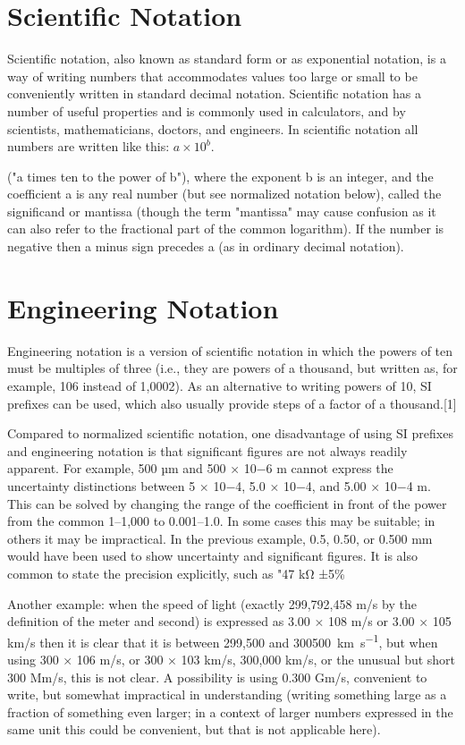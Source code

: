 \documentclass{tufte-book}
\begin{document}
\section{Scientific Notation}


Scientific notation, also known as standard form or as exponential notation, is a way of writing numbers that accommodates values too large or small to be conveniently written in standard decimal notation. Scientific notation has a number of useful properties and is commonly used in calculators, and by scientists, mathematicians, doctors, and engineers.
In scientific notation all numbers are written like this:
\(a \times 10^{b}\).

("a times ten to the power of b"), where the exponent b is an integer, and the coefficient a is any real number (but see normalized notation below), called the significand or mantissa (though the term "mantissa" may cause confusion as it can also refer to the fractional part of the common logarithm). If the number is negative then a minus sign precedes a (as in ordinary decimal notation).


\section{Engineering Notation}

Engineering notation is a version of scientific notation in which the powers of ten must be multiples of three (i.e., they are powers of a thousand, but written as, for example, 106 instead of 1,0002). As an alternative to writing powers of 10, SI prefixes can be used, which also usually provide steps of a factor of a thousand.[1]

Compared to normalized scientific notation, one disadvantage of using SI prefixes and engineering notation is that significant figures are not always readily apparent. For example, 500 µm and 500 × 10−6 m cannot express the uncertainty distinctions between 5 × 10−4, 5.0 × 10−4, and 5.00 × 10−4 m. This can be solved by changing the range of the coefficient in front of the power from the common 1–1,000 to 0.001–1.0. In some cases this may be suitable; in others it may be impractical. In the previous example, 0.5, 0.50, or 0.500 mm would have been used to show uncertainty and significant figures. It is also common to state the precision explicitly, such as "47 kΩ ±5\%

Another example: when the speed of light (exactly 299,792,458 m/s by the definition of the meter and second) is expressed as 3.00 × 108 m/s or 3.00 × 105 km/s then it is clear that it is between 299,500 and \SI{300500}{\km\per\s}, but when using 300 × 106 m/s, or 300 × 103 km/s, 300,000 km/s, or the unusual but short 300 Mm/s, this is not clear. A possibility is using 0.300 Gm/s, convenient to write, but somewhat impractical in understanding (writing something large as a fraction of something even larger; in a context of larger numbers expressed in the same unit this could be convenient, but that is not applicable here).
\end{document}
